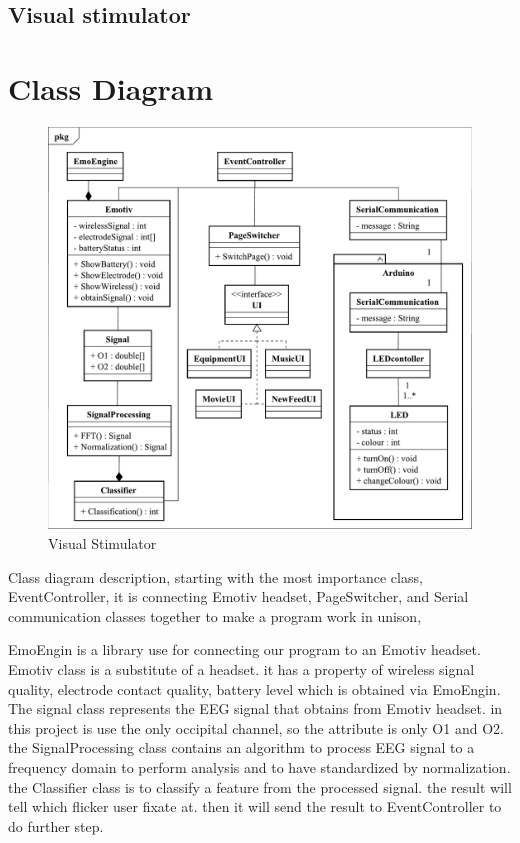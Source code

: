 \subsection{Visual stimulator}


\newpage
\section{Class Diagram}

\begin{figure}[ht]
	\centering
	\includegraphics[width=\textwidth]{chapter5/Class.pdf}
	\caption{Visual Stimulator}
\end{figure}

Class diagram description, starting with the most importance class, EventController, it is connecting Emotiv headset, PageSwitcher, and Serial communication classes together to make a program work in unison,

EmoEngin is a library use for connecting our program to an Emotiv headset.  Emotiv class is a substitute of a headset. it has a property of wireless signal quality, electrode contact quality, battery level which is obtained via EmoEngin. The signal class represents the EEG signal that obtains from Emotiv headset. in this project is use the only occipital channel, so the attribute is only O1 and O2. the SignalProcessing class contains an algorithm to process EEG signal to a frequency domain to perform analysis and to have standardized by normalization. the Classifier class is to classify a feature from the processed signal. the result will tell which flicker user fixate at. then it will send the result to EventController to do further step.

